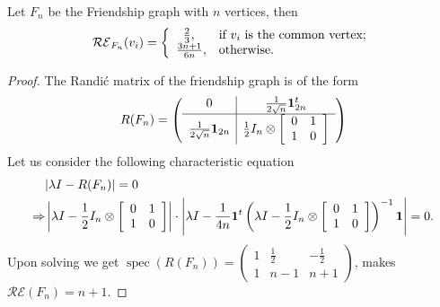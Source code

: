 \documentclass[10pt,a4paper]{amsart}
\newcommand{\spec}{\operatorname{spec}}
\begin{document}
\begin{proposition}
Let $F_n$ be the Friendship graph with $n$ vertices, then
$$\mathcal{RE}_{F_n}(v_i)=\left\{
    \begin{array}{ll}
      \;\;\frac{2}{3}, & \hbox{if $v_i$ is the common vertex;} \\
      \frac{3n+1}{6n}, & \hbox{otherwise.}
    \end{array}
  \right.
$$
\end{proposition}

\begin{proof}
The Randi\'c matrix of the friendship graph is of the form
$$
R(F_n)=\left(
  \begin{array}{c|c}
    0 & \frac{1}{2\sqrt{n}}{\bf{1}}^t_{2n} \\
\hline
    \frac{1}{2\sqrt{n}}{\bf{1}}_{2n} & \frac{1}{2}I_n\otimes \left[
                                                               \begin{array}{cc}
                                                                 0 & 1 \\
                                                                 1 & 0 \\
                                                               \end{array}
                                                             \right]
 \\
  \end{array}
\right)
$$
Let us consider the following characteristic equation
\begin{align*}
&|\lambda I-R(F_n)|=0\\
\Rightarrow&\left|\lambda I-\frac{1}{2}I_n\otimes \left[
                                                               \begin{array}{cc}
                                                                 0 & 1 \\
                                                                 1 & 0 \\
                                                               \end{array}
                                                             \right]\right|\cdot \left|\lambda I-\frac{1}{4n}{\bf{1}}^t\left(\lambda I-\frac{1}{2}I_n\otimes \left[
                                                               \begin{array}{cc}
                                                                 0 & 1 \\
                                                                 1 & 0 \\
                                                               \end{array}
                                                             \right]\right)^{-1}\bf{1}\right|=0.
\end{align*}
Upon solving we get
$\spec(R(F_n))=\left(\begin{array}{ccc}
    1 & \frac{1}{2} & -\frac{1}{2} \\
    1 & n-1 & n+1
  \end{array}\right)$, makes $\mathcal{RE}(F_n)=n+1$.


\end{proof}
\end{document}
